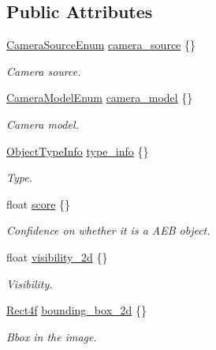 \subsection*{Public Attributes}
\begin{DoxyCompactItemize}
\item 
\hyperlink{structmaf__perception__interface_1_1CameraSourceEnum}{Camera\+Source\+Enum} \hyperlink{structmaf__perception__interface_1_1VisionAEBObject_a92059f230aac537ceedef0bbee641283}{camera\+\_\+source} \{\}
\begin{DoxyCompactList}\small\item\em Camera source. \end{DoxyCompactList}\item 
\hyperlink{structmaf__perception__interface_1_1CameraModelEnum}{Camera\+Model\+Enum} \hyperlink{structmaf__perception__interface_1_1VisionAEBObject_ae9170b9ebea5ec6c677fe6fbde5b263c}{camera\+\_\+model} \{\}
\begin{DoxyCompactList}\small\item\em Camera model. \end{DoxyCompactList}\item 
\hyperlink{structmaf__perception__interface_1_1ObjectTypeInfo}{Object\+Type\+Info} \hyperlink{structmaf__perception__interface_1_1VisionAEBObject_af35591e21f2415f7a10753a33e16962f}{type\+\_\+info} \{\}
\begin{DoxyCompactList}\small\item\em Type. \end{DoxyCompactList}\item 
float \hyperlink{structmaf__perception__interface_1_1VisionAEBObject_aa50e3debe5da3689804238961a8ef580}{score} \{\}
\begin{DoxyCompactList}\small\item\em Confidence on whether it is a A\+EB object. \end{DoxyCompactList}\item 
float \hyperlink{structmaf__perception__interface_1_1VisionAEBObject_a1476d909e4ca3b7a4766a2323a668fee}{visibility\+\_\+2d} \{\}
\begin{DoxyCompactList}\small\item\em Visibility. \end{DoxyCompactList}\item 
\hyperlink{structmaf__perception__interface_1_1Rect4f}{Rect4f} \hyperlink{structmaf__perception__interface_1_1VisionAEBObject_a72f32d87e52eabd263af8421be9e58d8}{bounding\+\_\+box\+\_\+2d} \{\}
\begin{DoxyCompactList}\small\item\em Bbox in the image. \end{DoxyCompactList}\item 

\end{DoxyCompactItemize}
